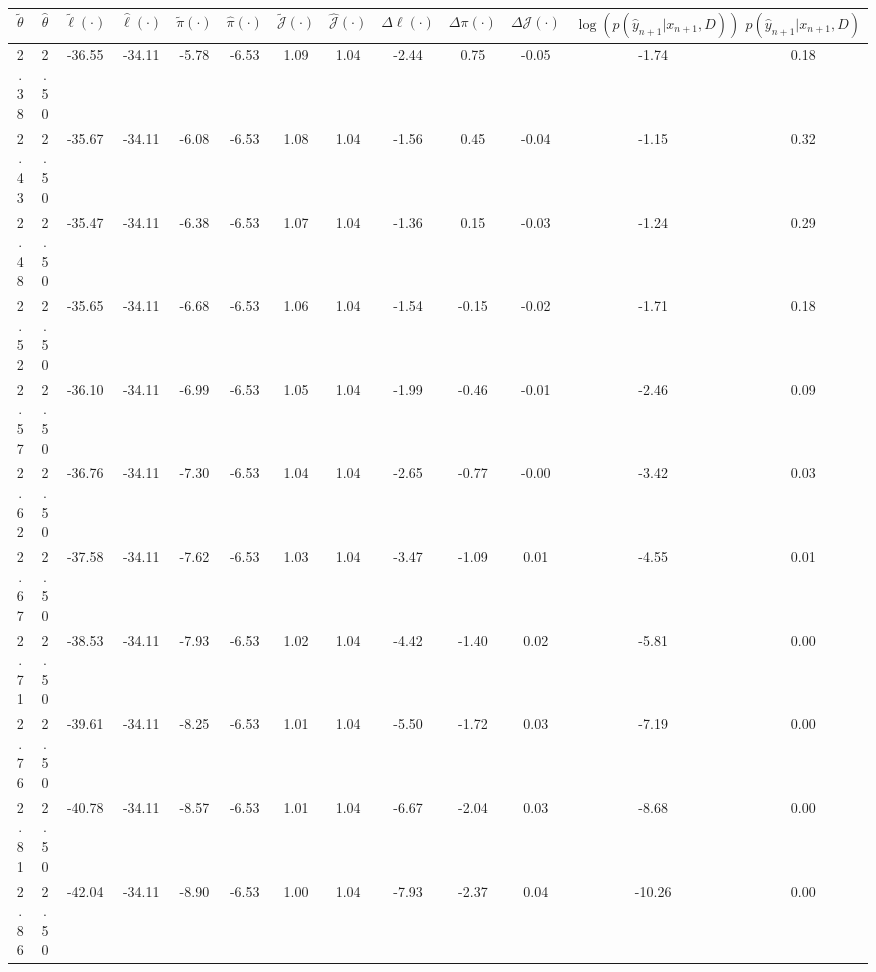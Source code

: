 \begin{table}[htbp]
        \centering
        \tiny
        \begin{adjustbox}{angle=90}
            \begin{tabular}{|c|c|c|c|c|c|c|c|c|c|c|c|c|}
                \hline
                 $\tilde{\theta}$ & $\hat{\theta}$ & $\tilde{\ell}(\cdot)$ & $\hat{\ell}(\cdot)$ & $\tilde{\pi}(\cdot)$ & $\hat{\pi}(\cdot)$ & $\tilde{\mathcal{J}}(\cdot)$ & $\hat{\mathcal{J}}(\cdot)$ & $\Delta \ell(\cdot)$ & $\Delta \pi(\cdot)$ & $\Delta \mathcal{J}(\cdot)$ & $\log(p(\hat{y}_{n+1}|x_{n+1}, D))$ & $p(\hat{y}_{n+1}|x_{n+1}, D)$ \\
                \hline
                 2.38 & 2.50 & -36.55 & -34.11 & -5.78 & -6.53 & 1.09 & 1.04 & -2.44 & 0.75 & -0.05 & -1.74 & 0.18\\ \hline
 2.43 & 2.50 & -35.67 & -34.11 & -6.08 & -6.53 & 1.08 & 1.04 & -1.56 & 0.45 & -0.04 & -1.15 & 0.32\\ \hline
 2.48 & 2.50 & -35.47 & -34.11 & -6.38 & -6.53 & 1.07 & 1.04 & -1.36 & 0.15 & -0.03 & -1.24 & 0.29\\ \hline
 2.52 & 2.50 & -35.65 & -34.11 & -6.68 & -6.53 & 1.06 & 1.04 & -1.54 & -0.15 & -0.02 & -1.71 & 0.18\\ \hline
 2.57 & 2.50 & -36.10 & -34.11 & -6.99 & -6.53 & 1.05 & 1.04 & -1.99 & -0.46 & -0.01 & -2.46 & 0.09\\ \hline
 2.62 & 2.50 & -36.76 & -34.11 & -7.30 & -6.53 & 1.04 & 1.04 & -2.65 & -0.77 & -0.00 & -3.42 & 0.03\\ \hline
 2.67 & 2.50 & -37.58 & -34.11 & -7.62 & -6.53 & 1.03 & 1.04 & -3.47 & -1.09 & 0.01 & -4.55 & 0.01\\ \hline
 2.71 & 2.50 & -38.53 & -34.11 & -7.93 & -6.53 & 1.02 & 1.04 & -4.42 & -1.40 & 0.02 & -5.81 & 0.00\\ \hline
 2.76 & 2.50 & -39.61 & -34.11 & -8.25 & -6.53 & 1.01 & 1.04 & -5.50 & -1.72 & 0.03 & -7.19 & 0.00\\ \hline
 2.81 & 2.50 & -40.78 & -34.11 & -8.57 & -6.53 & 1.01 & 1.04 & -6.67 & -2.04 & 0.03 & -8.68 & 0.00\\ \hline
 2.86 & 2.50 & -42.04 & -34.11 & -8.90 & -6.53 & 1.00 & 1.04 & -7.93 & -2.37 & 0.04 & -10.26 & 0.00\\ \hline
            \end{tabular}
        \end{adjustbox}
        \caption{}
        \label{}
    \end{table}
    